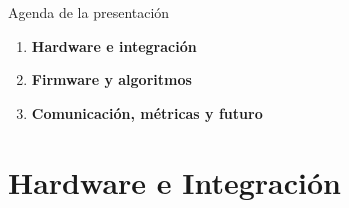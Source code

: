\documentclass[aspectratio=169, 10pt]{beamer}
\begin{document}
\begin{frame}{Agenda de la presentaci\'on}
    \Large
    \centering
    \vspace{0.8cm}
    \begin{enumerate}\itemsep0.4cm
        \item \textbf{Hardware e integraci\'on}
        \item \textbf{Firmware y algoritmos}
        \item \textbf{Comunicaci\'on, m\'etricas y futuro}
    \end{enumerate}
\end{frame}

\section{Hardware e Integraci\'on}
\end{document}

